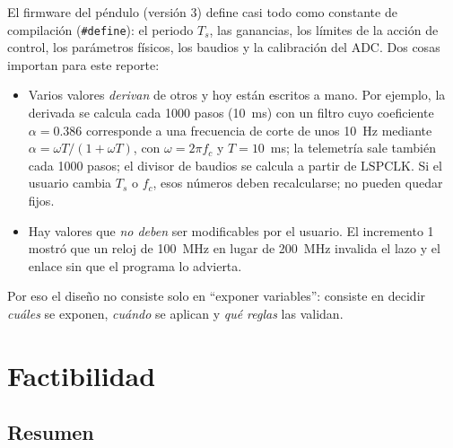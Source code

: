 \documentclass[12pt,letterpaper]{article}
\begin{document}
El firmware del péndulo (versión 3) define casi todo como constante de compilación (\texttt{\#define}): el periodo $T_s$, las ganancias, los límites de la acción de control, los parámetros físicos, los baudios y la calibración del ADC. Dos cosas importan para este reporte:

\begin{itemize}
    \item Varios valores \emph{derivan} de otros y hoy están escritos a mano. Por ejemplo, la derivada se calcula cada 1000 pasos (10~ms) con un filtro cuyo coeficiente $\alpha=0.386$ corresponde a una frecuencia de corte de unos 10~Hz mediante $\alpha=\omega T/(1+\omega T)$, con $\omega=2\pi f_c$ y $T=10$~ms; la telemetría sale también cada 1000 pasos; el divisor de baudios se calcula a partir de $\mathrm{LSPCLK}$. Si el usuario cambia $T_s$ o $f_c$, esos números deben recalcularse; no pueden quedar fijos.
    \item Hay valores que \emph{no deben} ser modificables por el usuario. El incremento 1 mostró que un reloj de 100~MHz en lugar de 200~MHz invalida el lazo y el enlace sin que el programa lo advierta.
\end{itemize}
Por eso el diseño no consiste solo en ``exponer variables'': consiste en decidir \emph{cuáles} se exponen, \emph{cuándo} se aplican y \emph{qué reglas} las validan.

\section{Factibilidad}
\label{sec:factibilidad}

\subsection{Resumen}
\end{document}
